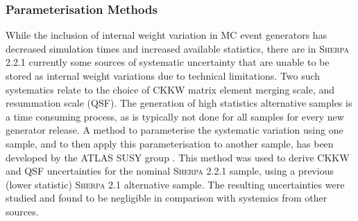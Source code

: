 \subsubsection{Parameterisation Methods}
While the inclusion of internal weight variation in MC event generators has decreased simulation times and increased available statistics, there are in \textsc{Sherpa 2.2.1} currently some sources of systematic uncertainty that are unable to be stored as internal weight variations due to technical limitations. Two such systematics relate to the choice of CKKW matrix element merging scale, and resummation scale (QSF). The generation of high statistics alternative samples is a time consuming process, as is typically not done for all samples for every new generator release. A method to parameterise the systematic variation using one sample, and to then apply this parameterisation to another sample, has been developed by the ATLAS SUSY group \cite{Anders:2125718}. This method was used to derive CKKW and QSF uncertainties for the nominal \textsc{Sherpa 2.2.1} sample, using a previous (lower statistic) \textsc{Sherpa 2.1} alternative sample. The resulting uncertainties were studied and found to be negligible in comparison with systemics from other sources.

